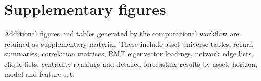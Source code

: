 \section{Supplementary figures}
\label{app:supplementary_figures}


Additional figures and tables generated by the computational workflow are retained as supplementary material. These include asset-universe tables, return summaries, correlation matrices, RMT eigenvector loadings, network edge lists, clique lists, centrality rankings and detailed forecasting results by asset, horizon, model and feature set.
